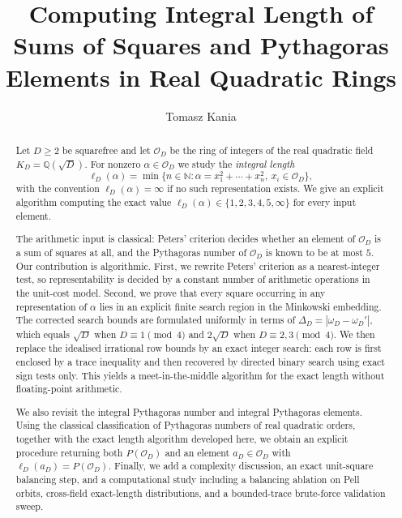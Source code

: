 \documentclass[manuscript,screen]{acmart}
\title[Integral sums of squares in real quadratic rings]{Computing Integral Length of Sums of Squares and Pythagoras Elements in Real Quadratic Rings}
\author{Tomasz Kania}
\affiliation{%
  \institution{Institute of Mathematics, Czech Academy of Sciences}
  \city{Prague}
  \country{Czech Republic}}
\affiliation{%
  \institution{Institute of Mathematics, Jagiellonian University}
  \city{Krak\'ow}
  \country{Poland}}
\renewcommand{\ge}{\geqslant}
\theoremstyle{plain}
\theoremstyle{definition}
\theoremstyle{nonitalicremark}
\newcommand{\Q}{\mathbb{Q}}
\newcommand{\OD}{\mathcal{O}_D}
\newcommand{\len}{\ell}
\newcommand{\wD}{\omega_D}
\newcommand{\wDp}{\omega_D'}
\begin{document}
\begin{abstract}
Let $D \ge 2$ be squarefree and let $\OD$ be the ring of integers of the real quadratic
field $K_D = \Q(\sqrt{D})$. For nonzero $\alpha \in \OD$ we study the \emph{integral
length}
\[
\len_D(\alpha) = \min\bigl\{n \in \mathbb{N} : \alpha = x_1^2 + \cdots + x_n^2,\ x_i \in \OD\bigr\},
\]
with the convention $\len_D(\alpha)=\infty$ if no such representation exists. We give an
explicit algorithm computing the exact value
$\len_D(\alpha) \in \{1,2,3,4,5,\infty\}$ for every input element.

The arithmetic input is classical: Peters' criterion decides whether an element of $\OD$ is a
sum of squares at all, and the Pythagoras number of $\OD$ is known to be at most $5$.
Our contribution is algorithmic. First, we rewrite Peters' criterion as a nearest-integer test,
so representability is decided by a constant number of arithmetic operations in the unit-cost
model. Second, we prove that every square occurring in any representation of $\alpha$ lies in an
explicit finite search region in the Minkowski embedding. The corrected search bounds are
formulated uniformly in terms of
$\Delta_D = |\wD - \wDp|$, which equals $\sqrt{D}$ when $D \equiv 1 \pmod 4$ and
$2\sqrt{D}$ when $D \equiv 2,3 \pmod 4$. We then replace the idealised irrational row bounds by an
exact integer search: each row is first enclosed by a trace inequality and then recovered by
directed binary search using exact sign tests only. This yields a meet-in-the-middle algorithm for
the exact length without floating-point arithmetic.

We also revisit the integral Pythagoras number and integral Pythagoras elements. Using the
classical classification of Pythagoras numbers of real quadratic orders, together with the exact
length algorithm developed here, we obtain an explicit procedure returning both $P(\OD)$ and an
element $a_D \in \OD$ with $\len_D(a_D)=P(\OD)$. Finally, we add a complexity discussion,
an exact unit-square balancing step, and a computational study including a balancing ablation on Pell orbits, cross-field exact-length distributions, and a bounded-trace brute-force validation sweep.
\end{abstract}
\end{document}
